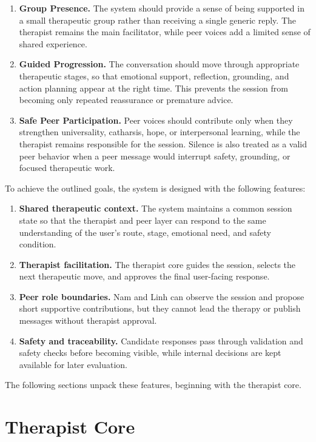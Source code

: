 \begin{enumerate}
    \item \textbf{Group Presence.} The system should provide a sense of being supported in a small therapeutic group rather than receiving a single generic reply. The therapist remains the main facilitator, while peer voices add a limited sense of shared experience.
    \item \textbf{Guided Progression.} The conversation should move through appropriate therapeutic stages, so that emotional support, reflection, grounding, and action planning appear at the right time. This prevents the session from becoming only repeated reassurance or premature advice.
    \item \textbf{Safe Peer Participation.} Peer voices should contribute only when they strengthen universality, catharsis, hope, or interpersonal learning, while the therapist remains responsible for the session. Silence is also treated as a valid peer behavior when a peer message would interrupt safety, grounding, or focused therapeutic work.
\end{enumerate}

To achieve the outlined goals, the system is designed with the following features:

\begin{enumerate}
    \item \textbf{Shared therapeutic context.} The system maintains a common session state so that the therapist and peer layer can respond to the same understanding of the user's route, stage, emotional need, and safety condition.
    \item \textbf{Therapist facilitation.} The therapist core guides the session, selects the next therapeutic move, and approves the final user-facing response.
    \item \textbf{Peer role boundaries.} Nam and Linh can observe the session and propose short supportive contributions, but they cannot lead the therapy or publish messages without therapist approval.
    \item \textbf{Safety and traceability.} Candidate responses pass through validation and safety checks before becoming visible, while internal decisions are kept available for later evaluation.
\end{enumerate}

The following sections unpack these features, beginning with the therapist core.

\section{Therapist Core}

